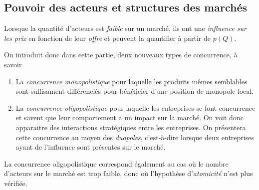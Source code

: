 

\subsection{Pouvoir des acteurs et structures des marchés} %
\label{sec:pouvoir_des_acteurs_et_structures_des_marches}

Lorsque la quantité d'acteurs est \emph{faible} sur un marché, 
ils ont une \emph{influence sur les prix} en fonction de leur \emph{offre} 
et peuvent la quantifier à partir de $p(Q)$. 

On introduit donc dans cette partie, deux nouveaux types de concurrence, à savoir
\begin{enumerate}
  \item La \emph{concurrence monopolistique} pour laquelle les produits mêmes semblables 
  sont suffisament différenciés pour bénéficier d'une position de monopole local. 
  \item La \emph{concurrence oligopolistique} pour laquelle les entreprises se font concurrence
  et savent que leur comportement a un impact sur la marché.
  On voit donc apparaitre des interactions stratégiques entre les entreprises.
  On présentera cette concurrence au moyen des \emph{duopoles}, c'est-à-dire lorsque deux entreprises
  ayant de l'influence sont présentes sur le marché.
\end{enumerate}

La concurrence oligopolistique correspond également au cas où le nombre d'acteurs
sur le marché est trop faible, donc où l'hypothèse d'\emph{atomicité} n'est plus vérifiée.


